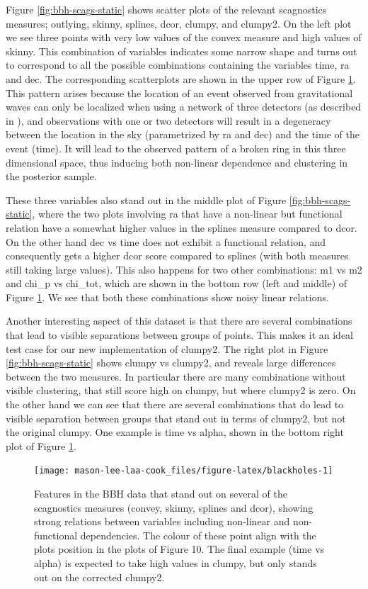Figure \ref{fig:bbh-scags-static} shows scatter plots of the relevant scagnostics measures; outlying, skinny, splines, dcor, clumpy, and clumpy2. On the left plot we see three points with very low values of the convex measure and high values of skinny. This combination of variables indicates some narrow shape and turns out to correspond to all the possible combinations containing the variables time, ra and dec. The corresponding scatterplots are shown in the upper row of Figure \ref{fig:blackholes}. This pattern arises because the location of an event observed from gravitational waves can only be localized when using a network of three detectors (as described in \citet{gwtriang}), and observations with one or two detectors will result in a degeneracy between the location in the sky (parametrized by ra and dec) and the time of the event (time). It will lead to the observed pattern of a broken ring in this three dimensional space, thus inducing both non-linear dependence and clustering in the posterior sample.

These three variables also stand out in the middle plot of Figure \ref{fig:bbh-scags-static}, where the two plots involving ra that have a non-linear but functional relation have a somewhat higher values in the splines measure compared to dcor. On the other hand dec vs time does not exhibit a functional relation, and consequently gets a higher dcor score compared to splines (with both measures still taking large values). This also happens for two other combinations: m1 vs m2 and chi\_p vs chi\_tot, which are shown in the bottom row (left and middle) of Figure \ref{fig:blackholes}. We see that both these combinations show noisy linear relations.

Another interesting aspect of this dataset is that there are several combinations that lead to visible separations between groups of points. This makes it an ideal test case for our new implementation of clumpy2. The right plot in Figure \ref{fig:bbh-scags-static} shows clumpy vs clumpy2, and reveals large differences between the two measures. In particular there are many combinations without visible clustering, that still score high on clumpy, but where clumpy2 is zero. On the other hand we can see that there are several combinations that do lead to visible separation between groups that stand out in terms of clumpy2, but not the original clumpy. One example is time vs alpha, shown in the bottom right plot of Figure \ref{fig:blackholes}.

\begin{figure}
\texttt{[image: mason-lee-laa-cook\_files/figure-latex/blackholes-1]} \caption{Features in the BBH data that stand out on several of the scagnostics measures (convey, skinny, splines and dcor), showing strong relations between variables including non-linear and non-functional dependencies. The colour of these point align with the plots position in the plots of Figure 10. The final example (time vs alpha) is expected to take high values in clumpy, but only stands out on the corrected clumpy2.}\label{fig:blackholes}
\end{figure}

